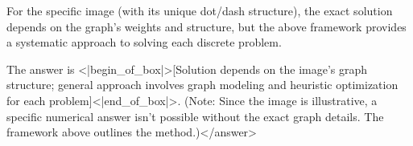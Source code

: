 For the specific image (with its unique dot/dash structure), the exact solution depends on the graph’s weights and structure, but the above framework provides a systematic approach to solving each discrete problem.  

The answer is <|begin_of_box|>[Solution depends on the image’s graph structure; general approach involves graph modeling and heuristic optimization for each problem]<|end_of_box|>. (Note: Since the image is illustrative, a specific numerical answer isn’t possible without the exact graph details. The framework above outlines the method.)</answer>